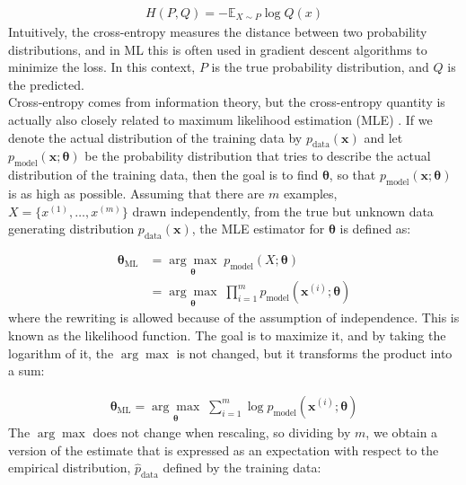 \begin{align}
    \label{cross-entropy} H(P,Q) = -\mathbb{E}_{X \sim P} \log Q(x)
\end{align}
Intuitively, the cross-entropy measures the distance between two probability distributions, and in ML this is often used in gradient descent algorithms to minimize the loss. In this context, $P$ is the true probability distribution, and $Q$ is the predicted. \\ 

\noindent Cross-entropy comes from information theory, but the cross-entropy quantity is actually also closely related to maximum likelihood estimation (MLE) \citep{goodfellow2016}. If we denote the actual distribution of the training data by $p_{\text{data}}(\mathbf{x})$ and let $p_{\text{model}}(\mathbf{x}; \boldsymbol{\theta})$ be the probability distribution that tries to describe the actual distribution of the training data, then the goal is to find $\boldsymbol{\theta}$, so that $p_{\text{model}}(\mathbf{x}; \boldsymbol{\theta})$ is as high as possible. Assuming that there are $m$ examples, $X = \{ x^{(1)}, \ldots, x^{(m)} \}$ drawn independently, from the true but unknown data generating distribution $p_{\text{data}}(\mathbf{x})$, the MLE estimator for $\boldsymbol{\theta}$ is defined as: 

\begin{align*}
    \boldsymbol{\theta}_{\text{ML}} &=  \underset{\boldsymbol{\theta}}{\arg \max} \;  p_{\text{model}} (X; \boldsymbol{\theta}) \\
    & = \underset{\boldsymbol{\theta}}{\arg \max} \; \prod_{i=1} ^m p_{\text{model}} (\mathbf{x}^{(i)}; \boldsymbol{\theta})
\end{align*}
where the rewriting is allowed because of the assumption of independence. This is known as the likelihood function. The goal is to maximize it, and by taking the logarithm of it, the $\arg \max$ is not changed, but it transforms the product into a sum:

\begin{align*}
    \boldsymbol{\theta}_{\text{ML}} = \underset{\boldsymbol{\theta}}{\arg \max} \; \sum_{i=1} ^m \log p_{\text{model}} (\mathbf{x}^{(i)}; \boldsymbol{\theta})
\end{align*}
The $\arg \max$ does not change when rescaling, so dividing by $m$, we obtain a version of the estimate that is expressed as an expectation with respect to the empirical distribution, $\hat{p}_{\text{data}}$ defined by the training data:

